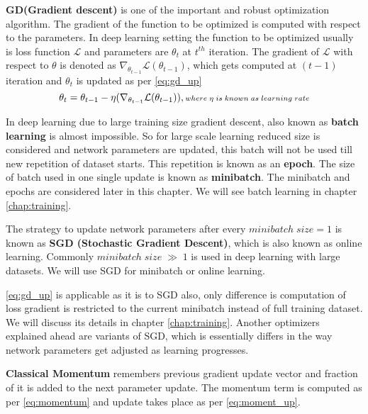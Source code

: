 \noindent \textbf{GD(Gradient descent)} is one of the important and robust optimization algorithm. The gradient of the function  to be optimized is computed with respect to the parameters. In deep learning setting the function to be optimized usually is loss function $\mathcal{L}$ and parameters are $\theta_t$ at $t^{th}$ iteration. The gradient of $\mathcal{L}$ with respect to $\theta$ is denoted as $\nabla_{\theta_{t-1}}\mathcal{L}(\theta_{t-1})$, which gets computed at $(t-1)$ iteration and $\theta_t$ is updated as per \ref{eq:gd_up}
\begin{equation}\label{eq:gd_up}
\theta_{t} = {\theta_{t-1}} -\eta (\nabla_{\theta_{t-1}}\mathcal{L}(\theta_{t-1})),\\ %
{\scriptstyle where \; \eta \; is \; known \; as \; learning \; rate}
\end{equation}


\noindent In deep learning due to large training size gradient descent, also known as \textbf{batch learning} is almost impossible. So for large scale learning reduced size is considered and network parameters are updated, this batch will not be used till new repetition of dataset starts. This repetition is known as an \textbf{epoch}. The size of batch used in one single update is known as \textbf{minibatch}.
The minibatch and epochs are considered later in this chapter. We will see batch learning in chapter \ref{chap:training}.

\noindent The strategy to update network parameters after every $minibatch \; size= 1$ is known as \textbf{SGD (Stochastic Gradient Descent)}, which is also known as online learning. 
Commonly $minibatch \; size \; \gg \; 1$ is used in deep learning with large datasets. We will use SGD for minibatch or online learning. 

\noindent \ref{eq:gd_up} is applicable as it is to SGD also, only difference is computation of loss gradient is restricted to the current minibatch instead of full training dataset. We will discuss its details in chapter \ref{chap:training}.
Another optimizers explained ahead are variants of SGD, which is essentially differs in the way network parameters get adjusted as learning progresses.  

\noindent \textbf{Classical Momentum}\cite{POLYAK19641} remembers previous gradient update vector and fraction of it is added to the next parameter update. The momentum term is computed as per \ref{eq:momentum} and update takes place as per \ref{eq:moment_up}. 

